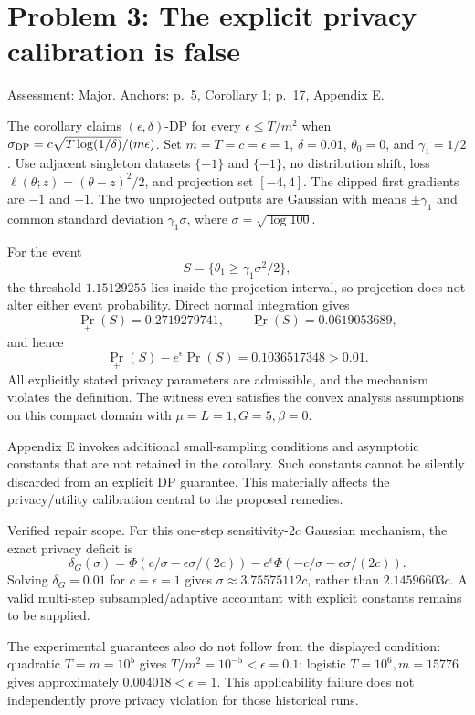 \documentclass[10pt]{article}
\begin{document}
\section*{Problem 3: The explicit privacy calibration is false}
Assessment: Major. Anchors: p. 5, Corollary 1; p. 17, Appendix E.\par
The corollary claims \((\epsilon,\delta)\)-DP for every \(\epsilon\le T/m^2\) when \(\sigma_{\rm DP}=c\sqrt{T\log(1/\delta)}/(m\epsilon)\). Set \(m=T=c=\epsilon=1\), \(\delta=0.01\), \(\theta_0=0\), and \(\gamma_1=1/2\). Use adjacent singleton datasets \(\{+1\}\) and \(\{-1\}\), no distribution shift, loss \(\ell(\theta;z)=(\theta-z)^2/2\), and projection set \([-4,4]\). The clipped first gradients are \(-1\) and \(+1\). The two unprojected outputs are Gaussian with means \(\pm\gamma_1\) and common standard deviation \(\gamma_1\sigma\), where \(\sigma=\sqrt{\log100}\).\par
For the event \[S=\{\theta_1\ge \gamma_1\sigma^2/2\},\] the threshold \(1.15129255\) lies inside the projection interval, so projection does not alter either event probability. Direct normal integration gives \[\Pr_+(S)=0.2719279741,\qquad
 \Pr_-(S)=0.0619053689,\] and hence \[\Pr_+(S)-e^\epsilon\Pr_-(S)=0.1036517348>0.01.\] All explicitly stated privacy parameters are admissible, and the mechanism violates the definition. The witness even satisfies the convex analysis assumptions on this compact domain with \(\mu=L=1,G=5,\beta=0\).\par
Appendix E invokes additional small-sampling conditions and asymptotic constants that are not retained in the corollary. Such constants cannot be silently discarded from an explicit DP guarantee. This materially affects the privacy/utility calibration central to the proposed remedies.\par
Verified repair scope. For this one-step sensitivity-\(2c\) Gaussian mechanism, the exact privacy deficit is \[\delta_G(\sigma)=\Phi(c/\sigma-\epsilon\sigma/(2c))
       -e^\epsilon\Phi(-c/\sigma-\epsilon\sigma/(2c)).\] Solving \(\delta_G=0.01\) for \(c=\epsilon=1\) gives \(\sigma\approx3.75575112c\), rather than \(2.14596603c\). A valid multi-step subsampled/adaptive accountant with explicit constants remains to be supplied.\par
The experimental guarantees also do not follow from the displayed condition: quadratic \(T=m=10^5\) gives \(T/m^2=10^{-5}<\epsilon=0.1\); logistic \(T=10^6,m=15776\) gives approximately \(0.004018<\epsilon=1\). This applicability failure does not independently prove privacy violation for those historical runs.\par
\end{document}
